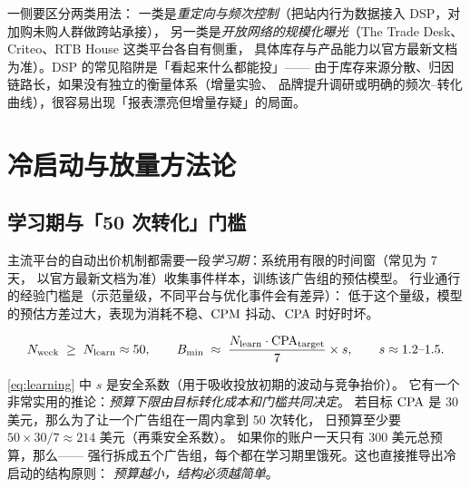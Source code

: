 一侧要区分两类用法：
一类是\emph{重定向与频次控制}（把站内行为数据接入 DSP，对加购未购人群做跨站承接），
另一类是\emph{开放网络的规模化曝光}（The Trade Desk、Criteo、RTB House 这类平台各自有侧重，
具体库存与产品能力以官方最新文档为准）。DSP 的常见陷阱是「看起来什么都能投」——
由于库存来源分散、归因链路长，如果没有独立的衡量体系（增量实验、
品牌提升调研或明确的频次--转化曲线），很容易出现「报表漂亮但增量存疑」的局面。

\section{冷启动与放量方法论}
\label{sec:meta-scaling}

\subsection{学习期与「50 次转化」门槛}

主流平台的自动出价机制都需要一段\emph{学习期}：系统用有限的时间窗（常见为 7 天，
以官方最新文档为准）收集事件样本，训练该广告组的预估模型。
行业通行的经验门槛是（示范量级，不同平台与优化事件会有差异）：
低于这个量级，模型的预估方差过大，表现为消耗不稳、$\operatorname{CPM}$ 抖动、$\operatorname{CPA}$ 时好时坏。

\begin{equation}
N_{\text{week}} \;\ge\; N_{\text{learn}} \approx 50 ,
\qquad
B_{\min} \;\approx\; \frac{N_{\text{learn}} \cdot \operatorname{CPA}_{\text{target}}}{7} \times s ,
\qquad
s \approx 1.2\text{--}1.5 .
\label{eq:learning}
\end{equation}

\cref{eq:learning} 中 $s$ 是安全系数（用于吸收投放初期的波动与竞争抬价）。
它有一个非常实用的推论：\emph{预算下限由目标转化成本和门槛共同决定}。
若目标 $\operatorname{CPA}$ 是 30 美元，那么为了让一个广告组在一周内拿到 50 次转化，
日预算至少要 $50 \times 30 / 7 \approx 214$ 美元（再乘安全系数）。
如果你的账户一天只有 300 美元总预算，那么——
强行拆成五个广告组，每个都在学习期里饿死。这也直接推导出冷启动的结构原则：
\emph{预算越小，结构必须越简单}。


